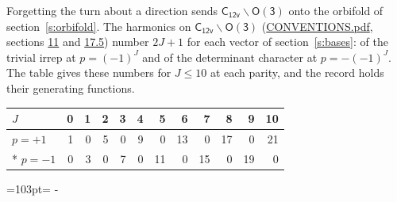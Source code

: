 \documentclass[10pt,a4paper]{article}
\newcommand{\needspace}[1]{\par\penalty-100\begingroup\dimen0=#1\relax\dimen2=\pagegoal
  \advance\dimen2-\pagetotal\ifdim\dimen0>\dimen2\relax\ifdim\dimen2>0pt\vfil\break\fi\fi
  \endgroup}
\numberwithin{equation}{section}
\newcommand{\grp}[1]{\mathsf{#1}}
\begin{document}
Forgetting the turn about a direction sends $\grp{C_{12v}}\backslash\grp{O(3)}$ onto the orbifold of section~\ref{s:orbifold}.
The harmonics on $\grp{C_{12v}}\backslash\grp{O(3)}$ (\href{../../CONVENTIONS.pdf}{CONVENTIONS.pdf}, sections \href{../../CONVENTIONS.pdf\#conv.11}{11} and \href{../../CONVENTIONS.pdf\#conv.17.5}{17.5}) number $2J + 1$ for each vector of section~\ref{s:bases}: of the trivial irrep at $p = (-1)^J$ and of the determinant character at $p = -(-1)^J$. The table gives these numbers for $J \le 10$ at each parity, and the record holds their generating functions.
{\small\setlength{\tabcolsep}{4pt}\begin{longtable}{@{}lrrrrrrrrrrr@{}}\toprule
$J$ & 0 & 1 & 2 & 3 & 4 & 5 & 6 & 7 & 8 & 9 & 10\\\midrule\endhead
\bottomrule\endfoot\endlastfoot
$p = +1$ & 1 & 0 & 5 & 0 & 9 & 0 & 13 & 0 & 17 & 0 & 21\\*
$p = -1$ & 0 & 3 & 0 & 7 & 0 & 11 & 0 & 15 & 0 & 19 & 0\\
\bottomrule\end{longtable}}
\needspace{103pt}
\end{document}
